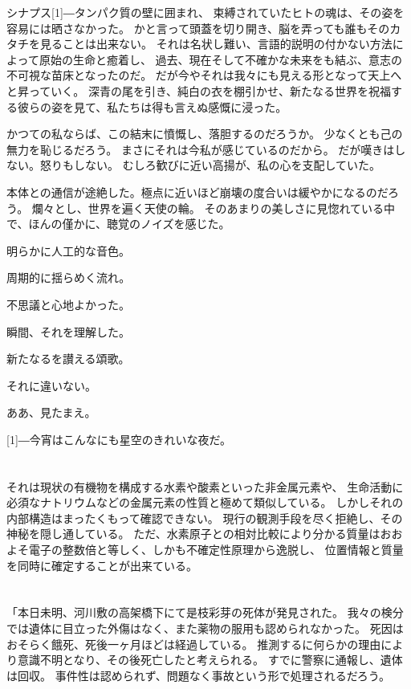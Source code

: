 \documentclass[autodetect-engine,dvipdfmx-if-dvi,a5paper,ja=standard,twoside,titlepage,final,twocolumn]{ltjtbook}
\begin{document}
シナプス\scalebox{3}[1]{―}タンパク質の壁に囲まれ、
束縛されていたヒトの魂は、その姿を容易には晒さなかった。
かと言って頭蓋を切り開き、脳を弄っても誰もそのカタチを見ることは出来ない。
それは名状し難い、言語的説明の付かない方法によって原始の生命と癒着し、
過去、現在そして不確かな未来をも結ぶ、意志の不可視な苗床となったのだ。
だが今やそれは我々にも見える形となって天上へと昇っていく。
深青の尾を引き、純白の衣を棚引かせ、新たなる世界を祝福する彼らの姿を見て、私たちは得も言えぬ感慨に浸った。

かつての私ならば、この結末に憤慨し、落胆するのだろうか。
少なくとも己の無力を恥じるだろう。
まさにそれは今私が感じているのだから。
だが嘆きはしない。怒りもしない。
むしろ歓びに近い高揚が、私の心を支配していた。

本体との通信が途絶した。極点に近いほど崩壊の度合いは緩やかになるのだろう。
爛々とし、世界を遍く天使の輪。
そのあまりの美しさに見惚れている中で、ほんの僅かに、聴覚のノイズを感じた。

明らかに人工的な音色。

周期的に揺らめく流れ。

不思議と心地よかった。

瞬間、それを理解した。

新たなるを讃える頌歌。

それに違いない。

ああ、見たまえ。

\scalebox{3}[1]{―}今宵はこんなにも星空のきれいな夜だ。
\section{}
それは現状の有機物を構成する水素や酸素といった非金属元素や、
生命活動に必須なナトリウムなどの金属元素の性質と極めて類似している。
しかしそれの内部構造はまったくもって確認できない。
現行の観測手段を尽く拒絶し、その神秘を隠し通している。
ただ、水素原子との相対比較により分かる質量はおおよそ電子の整数倍と等しく、しかも不確定性原理から逸脱し、
位置情報と質量を同時に確定することが出来ている。

\section{}
「本日未明、河川敷の高架橋下にて是枝彩芽の死体が発見された。
我々の検分では遺体に目立った外傷はなく、また薬物の服用も認められなかった。
死因はおそらく餓死、死後一ヶ月ほどは経過している。
推測するに何らかの理由により意識不明となり、その後死亡したと考えられる。
すでに警察に通報し、遺体は回収。
事件性は認められず、問題なく事故という形で処理されるだろう。
\end{document}
